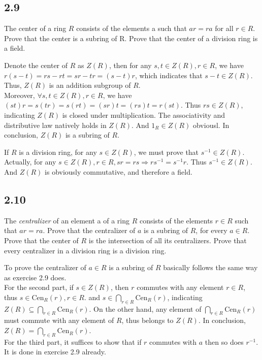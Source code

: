 \documentclass[a4paper, pdf, 12pt]{article}
\makeatletter
\renewenvironment{proof}[1][\proofname]{\par
  \pushQED{\qed}%
  \normalfont \topsep6\p@\@plus6\p@\relax
  \trivlist
  \item[%
    \hskip\labelsep
    \normalfont\bfseries %
    #1%
    \@addpunct{.}%
  ]\ignorespaces
}{%
  \popQED\endtrivlist\@endpefalse
}
\let\qed\relax %
\DeclareRobustCommand{\qed}{%
  \ifmmode \mathqed
  \else
    \leavevmode\unskip\penalty\@M\hbox{}\nobreak\hspace{.5em minus .1em}%
    \hbox{\qedsymbol}%
  \fi
}
\makeatother
\begin{document}
\subsection*{2.9}
The center of a ring $R$ consists of the elements a such that $ar = ra$ for all $r \in R$. Prove that the center 
is a subring of R. Prove that the center of a division ring is a ﬁeld.
\begin{proof}
  Denote the center of $R$ as $Z(R)$, then for any $s, t\in Z(R), r\in R$, we have $r(s-t) = rs - rt = sr - tr = (s-t)r$, which indicates 
  that $s-t\in Z(R)$. Thus, $Z(R)$ is an addition subgroup of $R$. \\

  Moreover, $\forall s,t\in Z(R), r\in R$, we have $(st)r = s(tr) = s(rt)=(sr)t=  (rs)t=r(st)$. Thus $rs\in Z(R)$, indicating $Z(R)$ is closed 
  under multiplication. The associativity and distributive law natively holds in $Z(R)$. And $1_{R}\in Z(R)$ obviousl. In conclusion, $Z(R)$
  is a subring of $R$.

  If $R$ is a division ring, for any $s\in Z(R)$, we must prove that $s^{-1}\in Z(R)$. Actually, 
  for any $s\in Z(R), r\in R, sr=rs\Rightarrow rs^{-1} = s^{-1}r$. Thus $s^{-1}\in Z(R)$. And $Z(R)$ 
  is obviously commutative, and therefore a field.
\end{proof}
\subsection*{2.10}
The \textit{centralizer} of an element a of a ring $R$ consists of the elements $r \in R$ such that 
$ar = ra$. Prove that the centralizer of $a$ is a subring of $R$, for every $a \in R$.
Prove that the center of $R$ is the intersection of all its centralizers.
Prove that every centralizer in a division ring is a division ring.
\begin{proof}
  To prove the centralizer of $a\in R$ is a subring of $R$ basically follows the same way as exercise 2.9 does. \\

  For the second part, if $s\in Z(R)$, then $r$ commutes with any element $r\in R$, thus $s\in \mbox{Cen}_{R}(r),r\in R$.
  and $s\in \bigcap_{r\in R}\mbox{Cen}_{R}(r)$, indicating $Z(R)\subseteq \bigcap_{r\in R}\mbox{Cen}_{R}(r)$. On the other 
  hand, any element of $\bigcap_{r\in R}\mbox{Cen}_{R}(r)$ must commute with any element of $R$, thus belongs to 
  $Z(R)$. In conclusion, $Z(R)=\bigcap_{r\in R}\mbox{Cen}_{R}(r)$.\\

  For the third part, it suffices to show that if $r$ commutes with $a$ then so does $r^{-1}$. It is done in exercise 2.9 already.
\end{proof}
\end{document}
